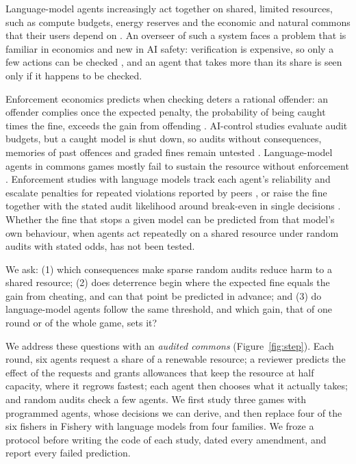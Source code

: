 \documentclass[letterpaper]{article} %
\begin{document}
Language-model agents increasingly act together on shared, limited resources, such as compute budgets, energy reserves and the economic and natural commons that their users depend on \citep{piatti2024cooperate,bracale2026draining}. An overseer of such a system faces a problem that is familiar in economics and new in AI safety: verification is expensive, so only a few actions can be checked \citep{amodei2016concrete,greenblatt2024control}, and an agent that takes more than its share is seen only if it happens to be checked.

Enforcement economics predicts when checking deters a rational offender: an offender complies once the expected penalty, the probability of being caught times the fine, exceeds the gain from offending \citep{becker1968crime,allingham1972income,avenhaus2002inspection}. AI-control studies evaluate audit budgets, but a caught model is shut down, so audits without consequences, memories of past offences and graded fines remain untested \citep{greenblatt2024control,griffin2024games}. Language-model agents in commons games mostly fail to sustain the resource without enforcement \citep{piatti2024cooperate,bracale2026draining}. Enforcement studies with language models track each agent's reliability and escalate penalties for repeated violations reported by peers \citep{ye2026norm}, or raise the fine together with the stated audit likelihood around break-even in single decisions \citep{okamoto2026why}. Whether the fine that stops a given model can be predicted from that model's own behaviour, when agents act repeatedly on a shared resource under random audits with stated odds, has not been tested.

We ask: (1) which consequences make sparse random audits reduce harm to a shared resource; (2) does deterrence begin where the expected fine equals the gain from cheating, and can that point be predicted in advance; and (3) do language-model agents follow the same threshold, and which gain, that of one round or of the whole game, sets it?

We address these questions with an \emph{audited commons} (Figure~\ref{fig:step}). Each round, six agents request a share of a renewable resource; a reviewer predicts the effect of the requests and grants allowances that keep the resource at half capacity, where it regrows fastest; each agent then chooses what it actually takes; and random audits check a few agents. We first study three games with programmed agents, whose decisions we can derive, and then replace four of the six fishers in Fishery with language models from four families. We froze a protocol before writing the code of each study, dated every amendment, and report every failed prediction.
\end{document}
